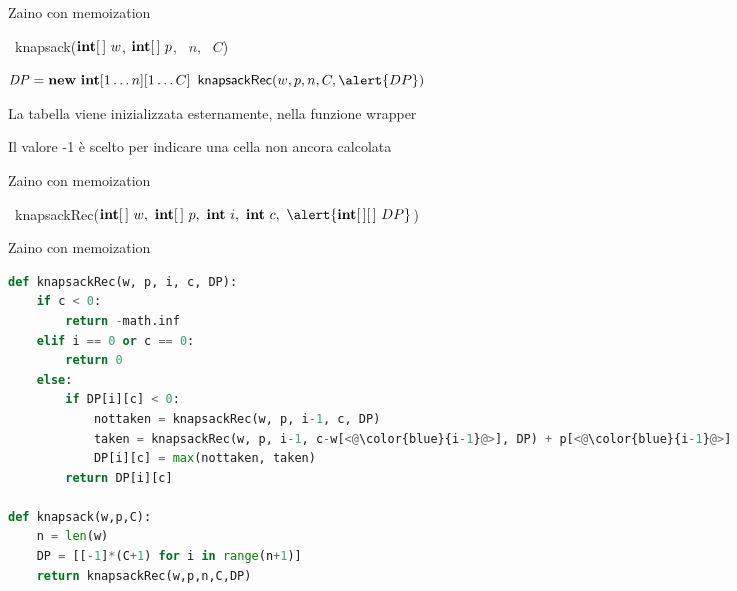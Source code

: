 \begin{frame}{Zaino con memoization}

\vspace{-9pt}
\begin{Procedure}
\caption[A]{\INTEGER\ \textsf{knapsack}($\INTEGER[\,]\ w$, $\INTEGER[\,]\ p$, \INTEGER\ $n$, \INTEGER\ $C$)}
\alert{$\mathit{DP} = \NEW\ \INTEGER[1 \ldots n][1 \ldots C]$\;
}
\Return $\textsf{knapsackRec}(w, p, n, C, \alert{DP})$
\end{Procedure}

\BIL
\item La tabella viene inizializzata esternamente, nella funzione wrapper
\item Il valore -1 è scelto per indicare una cella non ancora calcolata
\EIL

\end{frame}

\begin{frame}{Zaino con memoization}

\vspace{-9pt}
\begin{Procedure}
\caption[A]{\INTEGER\ \textsf{knapsackRec}($\INTARRAY\ w,\ \INTARRAY\ p,\  \INTEGER\ i,\ \INTEGER\ c,\ \alert{\INTARRAY[\,]\ DP}$)}

\end{Procedure}

\end{frame}



\begin{frame}[fragile,shrink=5]{Zaino con memoization}

\vspace{-18pt}
\begin{lstlisting}[language=python,tabsize=2]
def knapsackRec(w, p, i, c, DP):
	if c < 0:
		return -math.inf
	elif i == 0 or c == 0:
		return 0
	else:
		if DP[i][c] < 0:
			nottaken = knapsackRec(w, p, i-1, c, DP)
			taken = knapsackRec(w, p, i-1, c-w[<@\color{blue}{i-1}@>], DP) + p[<@\color{blue}{i-1}@>]
			DP[i][c] = max(nottaken, taken)
		return DP[i][c]

def knapsack(w,p,C):
	n = len(w)
	DP = [[-1]*(C+1) for i in range(n+1)]
	return knapsackRec(w,p,n,C,DP)
\end{lstlisting}

\end{frame}

